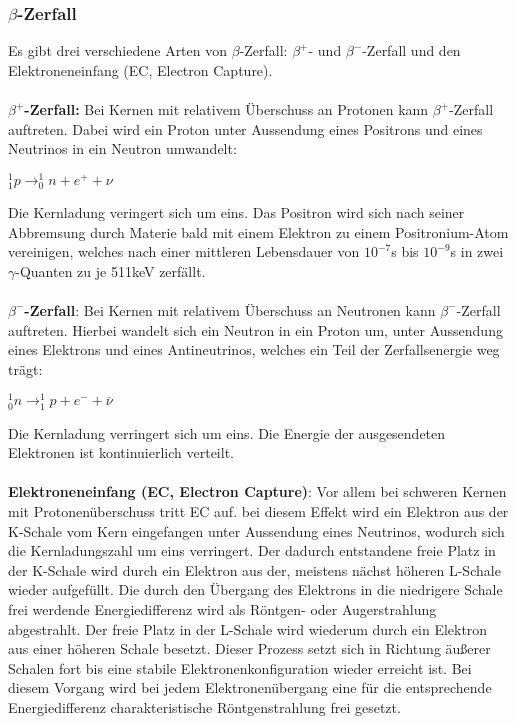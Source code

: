 \subsubsection{$\beta$-Zerfall}
Es gibt drei verschiedene Arten von $\beta$-Zerfall: $\beta^+$- und $\beta^-$-Zerfall und den Elektroneneinfang (EC, Electron Capture).\\
~\\
\textbf{$\beta^+$-Zerfall:} Bei Kernen mit relativem Überschuss an Protonen kann $\beta^+$-Zerfall auftreten. Dabei wird ein Proton unter Aussendung eines Positrons und eines Neutrinos in ein Neutron umwandelt:
\begin{center}
$\mathit{_1^1p \rightarrow _0^1n + e^+ + \nu}$
\end{center}
Die Kernladung veringert sich um eins. Das Positron wird sich nach seiner Abbremsung durch Materie bald mit einem Elektron zu einem Positronium-Atom vereinigen, welches nach einer mittleren Lebensdauer von $10^{-7}$s bis $10^{-9}$s in zwei $\gamma$-Quanten zu je 511keV zerfällt.\\
~\\
\textbf{$\beta^-$-Zerfall}: Bei Kernen mit relativem Überschuss an Neutronen kann $\beta^-$-Zerfall auftreten. Hierbei wandelt sich ein Neutron in ein Proton um, unter Aussendung eines Elektrons und eines Antineutrinos, welches ein Teil der Zerfallsenergie weg trägt:
\begin{center}
$\mathit{_0^1n \rightarrow _1^1p+e^- + \overline{\nu}}$
\end{center}
Die Kernladung verringert sich um eins. Die Energie der ausgesendeten Elektronen ist kontinuierlich verteilt.\\
~\\
\textbf{Elektroneneinfang (EC, Electron Capture)}: Vor allem bei schweren Kernen mit Protonenüberschuss tritt EC auf. bei diesem Effekt wird ein Elektron aus der K-Schale vom Kern eingefangen unter Aussendung eines Neutrinos, wodurch sich die Kernladungszahl um eins verringert. Der dadurch entstandene freie Platz in der K-Schale wird durch ein Elektron aus der, meistens nächst höheren L-Schale wieder aufgefüllt. Die durch den Übergang des Elektrons in die niedrigere Schale frei werdende Energiedifferenz wird als Röntgen- oder Augerstrahlung abgestrahlt. Der freie Platz in der L-Schale wird wiederum durch ein Elektron aus einer höheren Schale besetzt. Dieser Prozess setzt sich in Richtung äußerer Schalen fort bis eine stabile Elektronenkonfiguration wieder erreicht ist. Bei diesem Vorgang wird bei jedem Elektronenübergang eine für die entsprechende Energiedifferenz charakteristische Röntgenstrahlung frei gesetzt.
